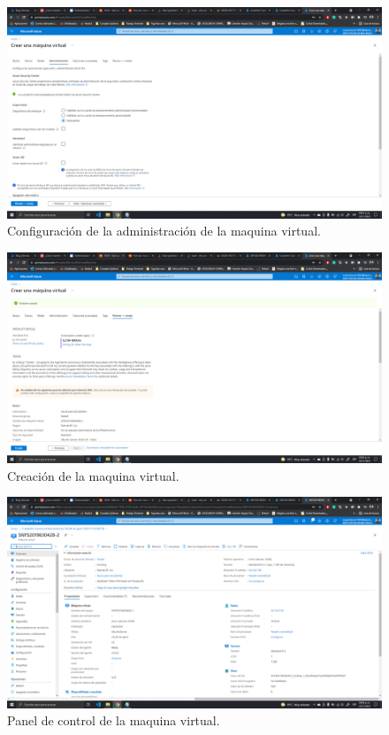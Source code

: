 \documentclass[11pt]{article}
\begin{document}
		\begin{figure}[H]
			\centering
			\includegraphics[scale=0.34]{resources/admin2.png}
			\caption{Configuración de la administración de la maquina virtual.}\label{fig:picture}
		\end{figure}
		\begin{figure}[H]
			\centering
			\includegraphics[scale=0.34]{resources/revisarycrear2.png}
			\caption{Creación de la maquina virtual.}\label{fig:picture}
		\end{figure}
		\begin{figure}[H]
			\centering
			\includegraphics[scale=0.34]{resources/paneldecontrol2.png}
			\caption{Panel de control de la maquina virtual.}\label{fig:picture}
		\end{figure}		
\end{document}
